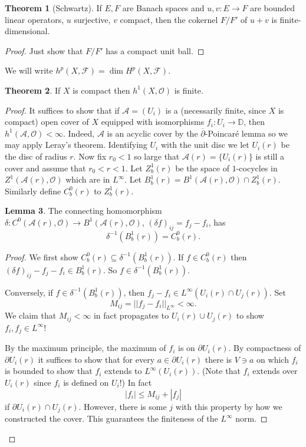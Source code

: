 \documentclass[12pt]{book}
\newcommand{\DD}{\mathbb{D}}
\newcommand{\Olo}{\mathscr O}
\newcommand{\dbar}{\overline\partial}
\theoremstyle{definition}
\newtheorem{theorem}{Theorem}[chapter]
\newtheorem{lemma}[theorem]{Lemma}
\begin{document}
\begin{theorem}[Schwartz]
If $E, F$ are Banach spaces and $u, v: E \to F$ are bounded linear operators, $u$ surjective, $v$ compact, then the cokernel $F/F'$ of $u + v$ is finite-dimensional.
\end{theorem}
\begin{proof}
Just show that $F/F'$ has a compact unit ball.
\end{proof}

We will write $h^p(X, \mathscr F) = \dim H^p(X, \mathscr F)$.

\begin{theorem}
If $X$ is compact then $h^1(X, \Olo)$ is finite.
\end{theorem}
\begin{proof}
It suffices to show that if $\mathscr A = (U_i)$ is a (necessarily finite, since $X$ is compact) open cover of $X$ equipped with isomorphisms $f_i: U_i \to \DD$, then $h^1(\mathscr A, \Olo) < \infty$.
Indeed, $\mathscr A$ is an acyclic cover by the $\dbar$-Poincar\'e lemma so we may apply Leray's theorem.
Identifying $U_i$ with the unit disc we let $U_i(r)$ be the disc of radius $r$.
Now fix $r_0 < 1$ so large that $\mathscr A(r) = \{U_i(r)\}$ is still a cover and assume that $r_0 < r < 1$.
Let $Z_b^1(r)$ be the space of $1$-cocycles in $Z^1(\mathscr A(r), \Olo)$ which are in $L^\infty$.
Let $B^1_b(r) = B^1(\mathscr A(r), \Olo) \cap Z^1_b(r)$.
Similarly define $C_b^0(r)$ to $Z_b^1(r)$.

\begin{lemma}
The connecting homomorphism $\delta: C^0(\mathscr A(r), \Olo) \to B^1(\mathscr A(r), \Olo)$, $(\delta f)_{ij} = f_j - f_i$, has
$$\delta^{-1}(B_b^1(r)) = C^0_b(r).$$
\end{lemma}
\begin{proof}
We first show $C^0_b(r) \subseteq \delta^{-1}(B_b^1(r))$.
If $f \in C^0_b(r)$ then $(\delta f)_{ij} - f_j - f_i \in B^1_b(r)$.
So $f \in \delta^{-1}(B_b^1(r))$.

Conversely, if $f \in \delta^{-1}(B_b^1(r))$, then $f_j - f_i \in L^\infty(U_i(r) \cap U_j(r))$.
Set
$$M_{ij} = ||f_j - f_i||_{L^\infty} < \infty.$$
We claim that $M_{ij} < \infty$ in fact propagates to $U_i(r) \cup U_j(r)$ to show $f_i, f_j \in L^\infty$!

By the maximum principle, the maximum of $f_i$ is on $\partial U_i(r)$.
By compactness of $\partial U_i(r)$ it suffices to show that for every $a \in \partial U_i(r)$ there is $V \ni a$ on which $f_i$ is bounded to show that $f_i$ extends to $L^\infty(U_i(r))$.
(Note that $f_i$ extends over $U_i(r)$ since $f_i$ is defined on $U_i$!)
In fact
$$|f_i| \leq M_{ij} + |f_j|$$
if $\partial U_i(r) \cap U_j(r)$.
However, there is some $j$ with this property by how we constructed the cover.
This guarantees the finiteness of the $L^\infty$ norm.
\end{proof}


\end{proof}
\end{document}
